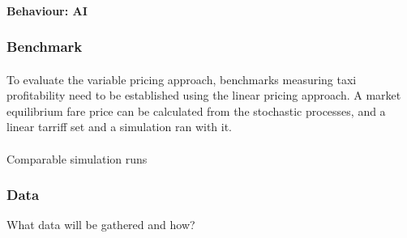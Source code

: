 \paragraph{Behaviour: AI}

\subsubsection{Benchmark} 

\paragraph{} To evaluate the variable pricing approach, benchmarks measuring
taxi profitability need to be established using the linear pricing approach.
A market equilibrium fare price can be calculated from the stochastic processes, and a linear tarriff set and a simulation ran with it.

\paragraph{} Comparable simulation runs

\subsubsection{Data} What data will be gathered and how?
